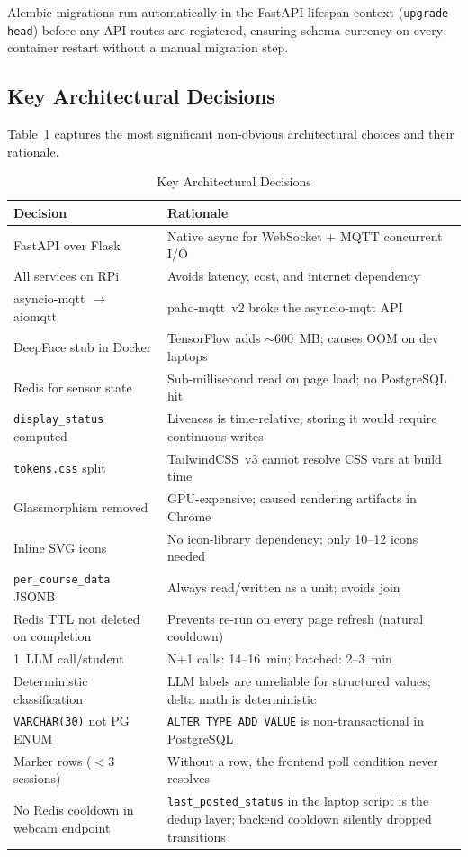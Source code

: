 Alembic migrations run automatically in the FastAPI lifespan context
(\texttt{upgrade head}) before any API routes are registered, ensuring
schema currency on every container restart without a manual migration
step.

\subsection{Key Architectural Decisions}
\label{subsec:arch_decisions}

Table~\ref{tab:arch_decisions} captures the most significant
non-obvious architectural choices and their rationale.

\begin{table}[H]
\centering
\caption{Key Architectural Decisions}
\label{tab:arch_decisions}
\begin{tabular}{@{}p{2.5cm}p{5.0cm}@{}}
\toprule
\textbf{Decision} & \textbf{Rationale} \\
\midrule
FastAPI over Flask          & Native async for WebSocket + MQTT concurrent I/O \\
All services on RPi         & Avoids latency, cost, and internet dependency \\
asyncio-mqtt $\rightarrow$ aiomqtt & paho-mqtt~v2 broke the asyncio-mqtt API \\
DeepFace stub in Docker     & TensorFlow adds $\sim$600~MB; causes OOM on dev laptops \\
Redis for sensor state      & Sub-millisecond read on page load; no PostgreSQL hit \\
\texttt{display\_status} computed & Liveness is time-relative; storing it would require continuous writes \\
\texttt{tokens.css} split   & TailwindCSS~v3 cannot resolve CSS vars at build time \\
Glassmorphism removed       & GPU-expensive; caused rendering artifacts in Chrome \\
Inline SVG icons            & No icon-library dependency; only 10--12 icons needed \\
\texttt{per\_course\_data} JSONB & Always read/written as a unit; avoids join \\
Redis TTL not deleted on completion & Prevents re-run on every page refresh (natural cooldown) \\
1~LLM call/student          & N+1 calls: 14--16~min; batched: 2--3~min \\
Deterministic classification & LLM labels are unreliable for structured values; delta math is deterministic \\
\texttt{VARCHAR(30)} not PG ENUM & \texttt{ALTER TYPE ADD VALUE} is non-transactional in PostgreSQL \\
Marker rows ($<3$ sessions)  & Without a row, the frontend poll condition never resolves \\
No Redis cooldown in webcam endpoint & \texttt{last\_posted\_status} in the laptop script is the dedup layer; backend cooldown silently dropped transitions \\
\bottomrule
\end{tabular}
\end{table}
